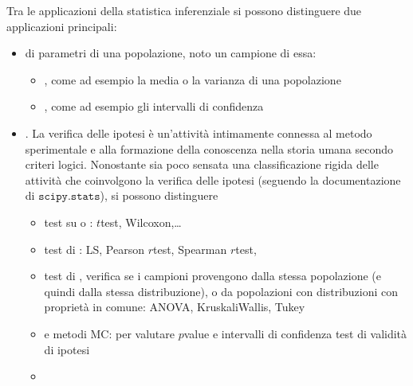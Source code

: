 \documentclass[letterpaper,10pt,italian]{jupyterBook}
\begin{document}
\sphinxAtStartPar
Tra le applicazioni della statistica inferenziale si possono distinguere due applicazioni principali:
\begin{itemize}
\item {} 
\sphinxAtStartPar
{\hyperref[\detokenize{ch/statistics/estimate:statistics-hs-inference-estimate}]{}} di parametri di una popolazione, noto un campione di essa:
\begin{itemize}
\item {} 
\sphinxAtStartPar
{}, come ad esempio la media o la varianza di una popolazione

\item {} 
\sphinxAtStartPar
{}, come ad esempio gli intervalli di confidenza

\end{itemize}

\item {} 
\sphinxAtStartPar
{\hyperref[\detokenize{ch/statistics/hp-test:statistics-hs-inference-hp-test}]{}}. La verifica delle ipotesi è un’attività intimamente connessa al metodo sperimentale e alla formazione della conoscenza nella storia umana secondo criteri logici. Nonostante sia poco sensata una classificazione rigida delle attività che coinvolgono la verifica delle ipotesi (seguendo la documentazione di \(\texttt{scipy.stats}\)), si possono distinguere
\begin{itemize}
\item {} 
\sphinxAtStartPar
test su  o : \(t\)\sphinxhyphen{}test, Wilcoxon,…

\item {} 
\sphinxAtStartPar
test di : LS, Pearson \(r\)\sphinxhyphen{}test, Spearman \(r\)\sphinxhyphen{}test,

\item {} 
\sphinxAtStartPar
test di , verifica se i campioni provengono dalla stessa popolazione (e quindi dalla stessa distribuzione), o da popolazioni con distribuzioni con proprietà in comune: ANOVA, Kruskali\sphinxhyphen{}Wallis, Tukey

\item {} 
\sphinxAtStartPar
{} e metodi MC: per valutare \(p\)\sphinxhyphen{}value e intervalli di confidenza test di validità di ipotesi

\item {} 
\sphinxAtStartPar
{}

\end{itemize}

\end{itemize}
\end{document}
